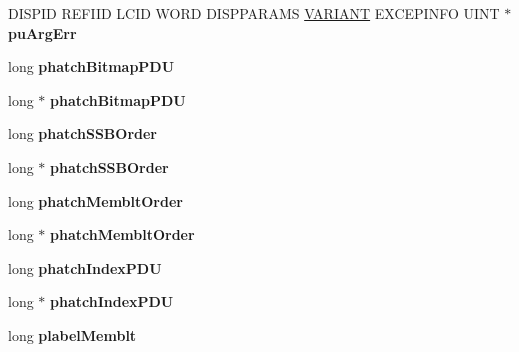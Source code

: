 \begin{DoxyCompactItemize}
\item 
\mbox{\label{struct_i_ms_tsc_debug_vtbl_a8fab7a58b135a014f36b680b79f53111}} 
D\+I\+S\+P\+ID R\+E\+F\+I\+ID L\+C\+ID W\+O\+RD D\+I\+S\+P\+P\+A\+R\+A\+MS \hyperlink{structtag_v_a_r_i_a_n_t}{V\+A\+R\+I\+A\+NT} E\+X\+C\+E\+P\+I\+N\+FO U\+I\+NT $\ast$ {\bfseries pu\+Arg\+Err}
\item 
\mbox{\label{struct_i_ms_tsc_debug_vtbl_aa321fa4a8bebf2b13ef93ac5df844b1c}} 
long {\bfseries phatch\+Bitmap\+P\+DU}
\item 
\mbox{\label{struct_i_ms_tsc_debug_vtbl_ac9004213870599873036d4cf1aefafe6}} 
long $\ast$ {\bfseries phatch\+Bitmap\+P\+DU}
\item 
\mbox{\label{struct_i_ms_tsc_debug_vtbl_aaf019d5cb2762ce0516ed9ad8b8643e9}} 
long {\bfseries phatch\+S\+S\+B\+Order}
\item 
\mbox{\label{struct_i_ms_tsc_debug_vtbl_aae3084e5a0e83d4bba96ba2b46d5da5f}} 
long $\ast$ {\bfseries phatch\+S\+S\+B\+Order}
\item 
\mbox{\label{struct_i_ms_tsc_debug_vtbl_a5f1db6f3f72bcbdc11ef71e4612ab04f}} 
long {\bfseries phatch\+Memblt\+Order}
\item 
\mbox{\label{struct_i_ms_tsc_debug_vtbl_ae9ea5321e551111224d1b2df192d0593}} 
long $\ast$ {\bfseries phatch\+Memblt\+Order}
\item 
\mbox{\label{struct_i_ms_tsc_debug_vtbl_a8932fda544d105b8d2dc467e3c8ea622}} 
long {\bfseries phatch\+Index\+P\+DU}
\item 
\mbox{\label{struct_i_ms_tsc_debug_vtbl_abb7b338a22f9834c23e0714692cf14da}} 
long $\ast$ {\bfseries phatch\+Index\+P\+DU}
\item 
\mbox{\label{struct_i_ms_tsc_debug_vtbl_aecfe576e6440b4a9b7b0a4b6b32924f6}} 
long {\bfseries plabel\+Memblt}
\item 
\mbox{\label{struct_i_ms_tsc_debug_vtbl_aa45d05d5a2d19f8cbd615ad67698043e}} 

\end{DoxyCompactItemize}
